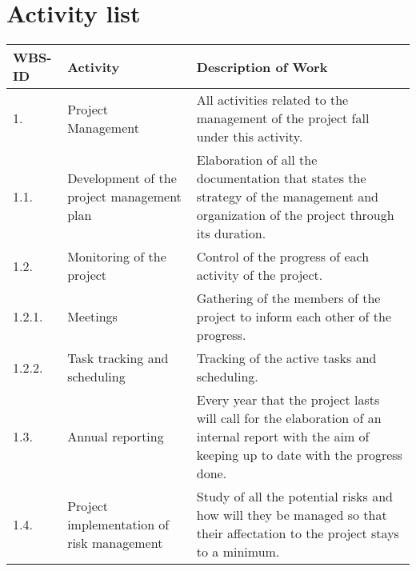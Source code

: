 \section{Activity list}

\begin{longtable}[H]{l >{\raggedright\arraybackslash}p{4cm} p{8cm}}
	
	\toprule[2pt]
	
	\textbf{WBS-ID} &  \textbf{Activity}  & \textbf{Description of Work} \\
	
	\midrule [1.5pt]
	\endhead
	
	1. & Project Management & All activities related to the management of the project fall under this activity.\vspace{0.2cm} \\
	
	\midrule
	
	1.1. & Development of the project management plan &Elaboration of all the documentation that states the strategy of the management and organization of the project through its duration.\vspace{0.2cm} \\
	
	\midrule
	
	1.2. & Monitoring of the project & Control of the progress of each activity of the project.\vspace{0.2cm} \\
	
	\midrule
	
	1.2.1. & Meetings & Gathering of the members of the project to inform each other of the progress.\vspace{0.2cm} \\
	
	\midrule
	
	1.2.2. & Task tracking and scheduling & Tracking of the active tasks and scheduling.\vspace{0.2cm} \\
	
	\midrule
	
	1.3. & Annual reporting & Every year that the project lasts will call for the elaboration of an internal report with the aim of keeping up to date with the progress done.\vspace{0.2cm} \\
	
	\midrule
	
	1.4. & Project implementation of risk management & Study of all the potential risks and how will they be managed so that their affectation to the project stays to a minimum.\vspace{0.2cm} \\
	

\end{longtable}
